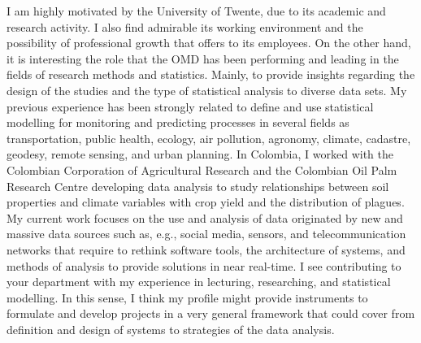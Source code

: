 \documentclass[11pt, a4paper]{awesome-cv}
\begin{document}
\begin{cvletter}
I am highly motivated by the University of Twente, due to its academic and research activity. I also find admirable its working environment and the possibility of professional growth that offers to its employees. On the other hand, it is interesting the role that the OMD has been performing and leading in the fields of research methods and statistics. Mainly, to provide insights regarding the design of the studies and the type of statistical analysis to diverse data sets. My previous experience has been strongly related to define and use statistical modelling for monitoring and predicting processes in several fields as transportation, public health, ecology, air pollution, agronomy, climate, cadastre, geodesy, remote sensing, and urban planning. In Colombia, I worked with the Colombian Corporation of Agricultural Research and the Colombian Oil Palm Research Centre developing data analysis to study relationships between soil properties and climate variables with crop yield and the distribution of plagues. My current work focuses on the use and analysis of data originated by new and massive data sources such as, e.g., social media, sensors, and telecommunication networks that require to rethink software tools, the architecture of systems, and methods of analysis to provide solutions in near real-time. I see contributing to your department with my experience in lecturing, researching, and statistical modelling. In this sense, I think my profile might provide instruments to formulate and develop projects in a very general framework that could cover from definition and design of systems to strategies of the data analysis.\par

\end{cvletter}
\end{document}
